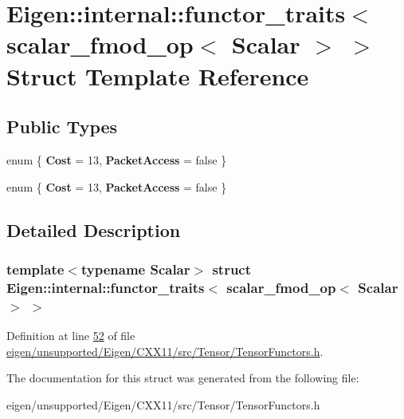 \hypertarget{struct_eigen_1_1internal_1_1functor__traits_3_01scalar__fmod__op_3_01_scalar_01_4_01_4}{}\section{Eigen\+:\+:internal\+:\+:functor\+\_\+traits$<$ scalar\+\_\+fmod\+\_\+op$<$ Scalar $>$ $>$ Struct Template Reference}
\label{struct_eigen_1_1internal_1_1functor__traits_3_01scalar__fmod__op_3_01_scalar_01_4_01_4}
\subsection*{Public Types}
\begin{DoxyCompactItemize}
\item 
\mbox{\label{struct_eigen_1_1internal_1_1functor__traits_3_01scalar__fmod__op_3_01_scalar_01_4_01_4_a7caff18e36e4d47905fd6ebe9708a6f8}} 
enum \{ {\bfseries Cost} = 13, 
{\bfseries Packet\+Access} = false
 \}
\item 
\mbox{\label{struct_eigen_1_1internal_1_1functor__traits_3_01scalar__fmod__op_3_01_scalar_01_4_01_4_a336eab104c71fe5d11d33e044f2be956}} 
enum \{ {\bfseries Cost} = 13, 
{\bfseries Packet\+Access} = false
 \}
\end{DoxyCompactItemize}


\subsection{Detailed Description}
\subsubsection*{template$<$typename Scalar$>$\newline
struct Eigen\+::internal\+::functor\+\_\+traits$<$ scalar\+\_\+fmod\+\_\+op$<$ Scalar $>$ $>$}



Definition at line \hyperlink{eigen_2unsupported_2_eigen_2_c_x_x11_2src_2_tensor_2_tensor_functors_8h_source_l00052}{52} of file \hyperlink{eigen_2unsupported_2_eigen_2_c_x_x11_2src_2_tensor_2_tensor_functors_8h_source}{eigen/unsupported/\+Eigen/\+C\+X\+X11/src/\+Tensor/\+Tensor\+Functors.\+h}.



The documentation for this struct was generated from the following file\+:\begin{DoxyCompactItemize}
\item 
eigen/unsupported/\+Eigen/\+C\+X\+X11/src/\+Tensor/\+Tensor\+Functors.\+h\end{DoxyCompactItemize}

